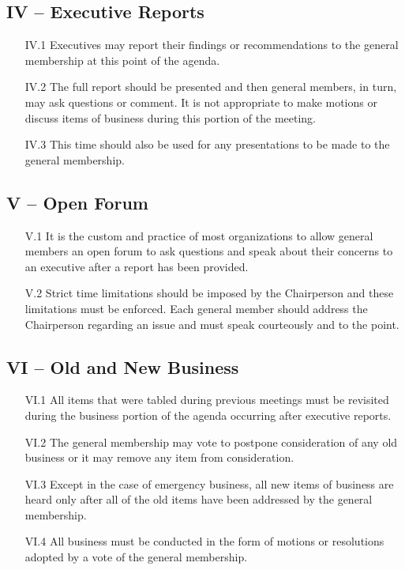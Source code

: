\documentclass[12pt,a4paper]{article}
\begin{document}
\subsection*{IV – Executive Reports}

\begin{enumerate}
\item[IV.1] Executives may report their findings or recommendations to the general membership at this point of the agenda.

\item[IV.2] The full report should be presented and then general members, in turn, may ask questions or comment. It is not appropriate to make motions or discuss items of business during this portion of the meeting.

\item[IV.3] This time should also be used for any presentations to be made to the general membership.
\end{enumerate}

\subsection*{V – Open Forum}

\begin{enumerate}
\item[V.1] It is the custom and practice of most organizations to allow general members an open forum to ask questions and speak about their concerns to an executive after a report has been provided.

\item[V.2] Strict time limitations should be imposed by the Chairperson and these limitations must be enforced. Each general member should address the Chairperson regarding an issue and must speak courteously and to the point.
\end{enumerate}

\subsection*{VI – Old and New Business}

\begin{enumerate}
\item[VI.1] All items that were tabled during previous meetings must be revisited during the business portion of the agenda occurring after executive reports.

\item[VI.2] The general membership may vote to postpone consideration of any old business or it may remove any item from consideration.

\item[VI.3] Except in the case of emergency business, all new items of business are heard only after all of the old items have been addressed by the general membership.

\item[VI.4] All business must be conducted in the form of motions or resolutions adopted by a vote of the general membership.
\end{enumerate}
\end{document}
